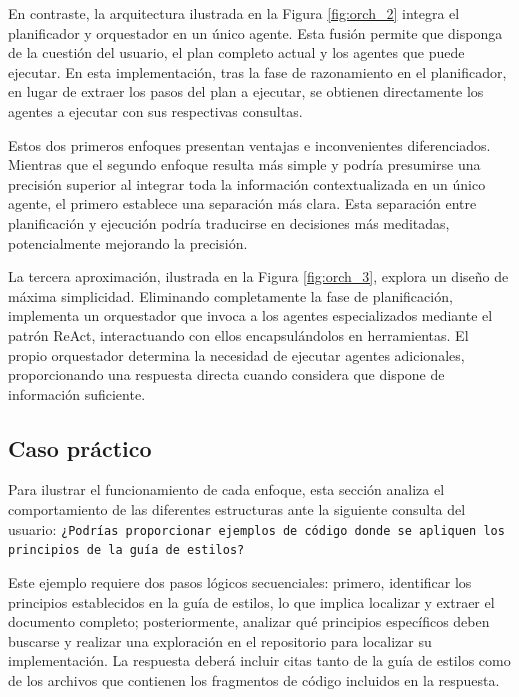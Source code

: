 En contraste, la arquitectura ilustrada en la Figura \ref{fig:orch_2} integra el planificador y orquestador en un único agente. Esta fusión permite que disponga de la cuestión del usuario, el plan completo actual y los agentes que puede ejecutar. En esta implementación, tras la fase de razonamiento en el planificador, en lugar de extraer los pasos del plan a ejecutar, se obtienen directamente los agentes a ejecutar con sus respectivas consultas.

Estos dos primeros enfoques presentan ventajas e inconvenientes diferenciados. Mientras que el segundo enfoque resulta más simple y podría presumirse una precisión superior al integrar toda la información contextualizada en un único agente, el primero establece una separación más clara. Esta separación entre planificación y ejecución podría traducirse en decisiones más meditadas, potencialmente mejorando la precisión.

La tercera aproximación, ilustrada en la Figura \ref{fig:orch_3}, explora un diseño de máxima simplicidad. Eliminando completamente la fase de planificación, implementa un orquestador que invoca a los agentes especializados mediante el patrón ReAct, interactuando con ellos encapsulándolos en herramientas. El propio orquestador determina la necesidad de ejecutar agentes adicionales, proporcionando una respuesta directa cuando considera que dispone de información suficiente.

\subsection{Caso práctico}
Para ilustrar el funcionamiento de cada enfoque, esta sección analiza el comportamiento de las diferentes estructuras ante la siguiente consulta del usuario: \texttt{¿Podrías proporcionar ejemplos de código donde se apliquen los principios de la guía de estilos?}

Este ejemplo requiere dos pasos lógicos secuenciales: primero, identificar los principios establecidos en la guía de estilos, lo que implica localizar y extraer el documento completo; posteriormente, analizar qué principios específicos deben buscarse y realizar una exploración en el repositorio para localizar su implementación. La respuesta deberá incluir citas tanto de la guía de estilos como de los archivos que contienen los fragmentos de código incluidos en la respuesta.

